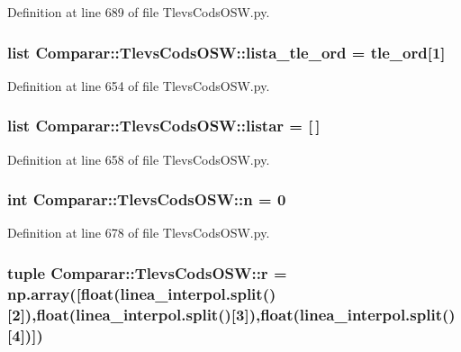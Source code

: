 \-Definition at line 689 of file \-Tlevs\-Cods\-O\-S\-W.\-py.

\subsubsection[{lista\-\_\-tle\-\_\-ord}]{\setlength{\rightskip}{0pt plus 5cm}list {\bf \-Comparar\-::\-Tlevs\-Cods\-O\-S\-W\-::lista\-\_\-tle\-\_\-ord} = {\bf tle\-\_\-ord}[1]}\label{namespace_comparar_1_1_tlevs_cods_o_s_w_a9fef17d7d75b265e9225754672197bb9}


\-Definition at line 654 of file \-Tlevs\-Cods\-O\-S\-W.\-py.

\subsubsection[{listar}]{\setlength{\rightskip}{0pt plus 5cm}list {\bf \-Comparar\-::\-Tlevs\-Cods\-O\-S\-W\-::listar} = [$\,$]}\label{namespace_comparar_1_1_tlevs_cods_o_s_w_a9433da424e0f606225111d856804ce53}


\-Definition at line 658 of file \-Tlevs\-Cods\-O\-S\-W.\-py.

\subsubsection[{n}]{\setlength{\rightskip}{0pt plus 5cm}int {\bf \-Comparar\-::\-Tlevs\-Cods\-O\-S\-W\-::n} = 0}\label{namespace_comparar_1_1_tlevs_cods_o_s_w_a3992130f41fc449ce600a45bb9ac4a11}


\-Definition at line 678 of file \-Tlevs\-Cods\-O\-S\-W.\-py.

\subsubsection[{r}]{\setlength{\rightskip}{0pt plus 5cm}tuple {\bf \-Comparar\-::\-Tlevs\-Cods\-O\-S\-W\-::r} = np.\-array([float(linea\-\_\-interpol.\-split()[2]),float(linea\-\_\-interpol.\-split()[3]),float(linea\-\_\-interpol.\-split()[4])])}\label{namespace_comparar_1_1_tlevs_cods_o_s_w_ae6320a32b24556b0740d386d1e4af0b6}


